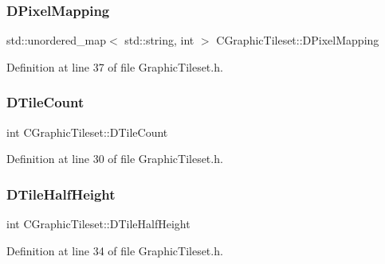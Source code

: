 \subsubsection{\texorpdfstring{D\+Pixel\+Mapping}{DPixelMapping}}
{\footnotesize\ttfamily std\+::unordered\+\_\+map$<$ std\+::string, int $>$ C\+Graphic\+Tileset\+::\+D\+Pixel\+Mapping\hspace{0.3cm}{\ttfamily [protected]}}



Definition at line 37 of file Graphic\+Tileset.\+h.

\hypertarget{classCGraphicTileset_a39d942b370e47f441bf97385eb1037c8}{}\label{classCGraphicTileset_a39d942b370e47f441bf97385eb1037c8} 
\subsubsection{\texorpdfstring{D\+Tile\+Count}{DTileCount}}
{\footnotesize\ttfamily int C\+Graphic\+Tileset\+::\+D\+Tile\+Count\hspace{0.3cm}{\ttfamily [protected]}}



Definition at line 30 of file Graphic\+Tileset.\+h.

\hypertarget{classCGraphicTileset_a16c8bc4e4c8738fe561b0408cd40ccef}{}\label{classCGraphicTileset_a16c8bc4e4c8738fe561b0408cd40ccef} 
\subsubsection{\texorpdfstring{D\+Tile\+Half\+Height}{DTileHalfHeight}}
{\footnotesize\ttfamily int C\+Graphic\+Tileset\+::\+D\+Tile\+Half\+Height\hspace{0.3cm}{\ttfamily [protected]}}



Definition at line 34 of file Graphic\+Tileset.\+h.

\hypertarget{classCGraphicTileset_a3e82808009078ce29f6b74bcd077b251}{}\label{classCGraphicTileset_a3e82808009078ce29f6b74bcd077b251} 
